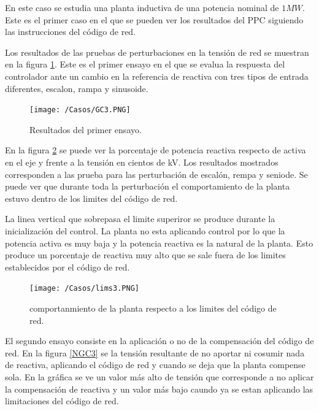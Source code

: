 \documentclass{book}
\begin{document}
En este caso se estudia una planta inductiva de una potencia nominal de $1MW$. Este es el primer caso en el que se pueden ver los resultados del PPC siguiendo las instrucciones del c\'odigo de red. \par

Los resultados de las pruebas de perturbaciones en la tensi\'on de red se muestran en la figura \ref{GC3}. Este es el primer ensayo en el que se evalua la respuesta del controlador ante un cambio en la referencia de reactiva con tres tipos de entrada diferentes, escalon, rampa y sinusoide. \par

\begin{figure}[h!]
\centering
\texttt{[image: /Casos/GC3.PNG]}
\caption{Resultados del primer ensayo. }
\label{GC3}
\end{figure} \par

En la figura \ref{lims3} se puede ver la porcentaje de potencia reactiva respecto de activa en el eje y frente a la tensi\'on en cientos de kV. Los resultados mostrados corresponden a las prueba para las perturbaci\'on de escal\'on, rempa y seniode. Se puede ver que durante toda la perturbaci\'on el comportamiento de la planta estuvo dentro de los limites del c\'odigo de red. \par

La linea vertical que sobrepasa el limite superiror se produce durante la inicializaci\'on del control. La planta no esta aplicando control por lo que la potencia activa es muy baja y la potencia reactiva es la natural de la planta. Esto produce un porcentaje de reactiva muy alto que se sale fuera de los limites establecidos por el c\'odigo de red. \par  

\begin{figure}[h!]
\centering
\texttt{[image: /Casos/lims3.PNG]}
\caption{comportanmiento de la planta respecto a los limites del c\'odigo de red. }
\label{lims3}
\end{figure} \par

El segundo ensayo consiste en la aplicaci\'on o no de la compensaci\'on del c\'odigo de red. En la figura \ref{NGC3} se la tensi\'on resultante de no aportar ni cosumir nada de reactiva, aplicando el c\'odigo de red y cuando se deja que la planta compense sola. En la gr\'afica se ve un valor m\'as alto de tensi\'on que corresponde a no aplicar la compensaci\'on de reactiva y un valor m\'as bajo caundo ya se estan aplicando las limitaciones del c\'odigo de red. \par
\end{document}
